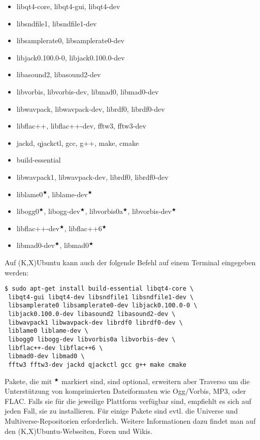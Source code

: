 \begin{itemize}
 \item libqt4-core, libqt4-gui, libqt4-dev
 \item libsndfile1, libsndfile1-dev
 \item libsamplerate0, libsamplerate0-dev
 \item libjack0.100.0-0, libjack0.100.0-dev
 \item libasound2, libasound2-dev
 \item libvorbis, libvorbis-dev, libmad0, libmad0-dev
 \item libwavpack, libwavpack-dev, librdf0, librdf0-dev
 \item libflac++, libflac++-dev, fftw3, fftw3-dev
 \item jackd, qjackctl, gcc, g++, make, cmake
 \item build-essential
 \item libwavpack1, libwavpack-dev, librdf0, librdf0-dev
 \item liblame0$^\bigstar$, liblame-dev$^\bigstar$
 \item libogg0$^\bigstar$, libogg-dev$^\bigstar$, libvorbis0a$^\bigstar$, libvorbis-dev$^\bigstar$
 \item libflac++-dev$^\bigstar$, libflac++6$^\bigstar$
 \item libmad0-dev$^\bigstar$, libmad0$^\bigstar$
\end{itemize}
Auf (K,X)Ubuntu kann auch der folgende Befehl auf einem Terminal eingegeben werden:
\begin{verbatim}
$ sudo apt-get install build-essential libqt4-core \
 libqt4-gui libqt4-dev libsndfile1 libsndfile1-dev \
 libsamplerate0 libsamplerate0-dev libjack0.100.0-0 \
 libjack0.100.0-dev libasound2 libasound2-dev \
 libwavpack1 libwavpack-dev librdf0 librdf0-dev \
 liblame0 liblame-dev \
 libogg0 libogg-dev libvorbis0a libvorbis-dev \
 libflac++-dev libflac++6 \
 libmad0-dev libmad0 \
 fftw3 fftw3-dev jackd qjackctl gcc g++ make cmake
\end{verbatim}

Pakete, die mit $^\bigstar$ markiert sind, sind optional, erweitern aber Traverso um die Unterstützung von komprimierten Dateiformaten wie Ogg/Vorbis, MP3, oder FLAC. Falls sie für die jeweilige Plattform verfügbar sind, empfiehlt es sich auf jeden Fall, sie zu installieren. Für einige Pakete sind evtl. die Universe und Multiverse-Repositorien erforderlich. Weitere Informationen dazu findet man auf den (K,X)Ubuntu-Webseiten, Foren und Wikis.

